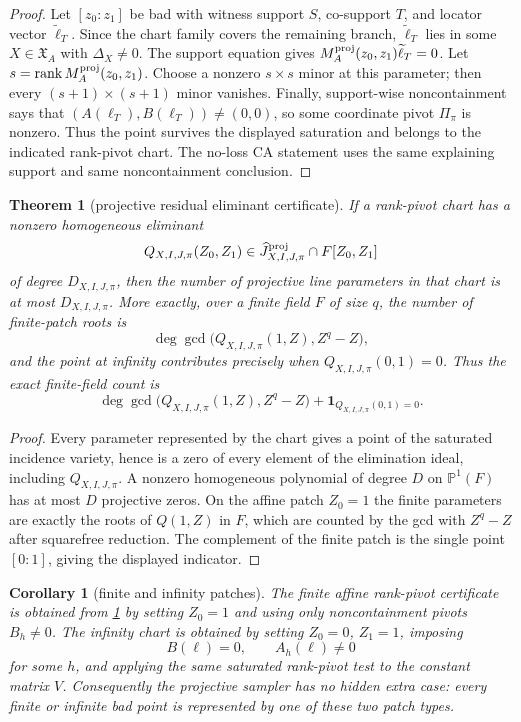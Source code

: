 \documentclass[11pt]{article}
\newtheorem{theorem}{Theorem}[section]
\newtheorem{corollary}[corollary]{Corollary}
\theoremstyle{definition}
\theoremstyle{remark}
\begin{document}
\begin{proof}
Let $[z_0:z_1]$ be bad with witness support $S$, co-support $T$, and locator
vector $\widetilde\ell_T$.  Since the chart family covers the remaining branch,
$\widetilde\ell_T$ lies in some $X\in\mathfrak X_A$ with $\Delta_X\ne0$.  The
support equation gives
$M^{\rm proj}_A(z_0,z_1)\widetilde\ell_T=0$.  Let
$s=\operatorname{rank}M^{\rm proj}_A(z_0,z_1)$.  Choose a nonzero
$s\times s$ minor at this parameter; then every $(s+1)\times(s+1)$ minor
vanishes.  Finally, support-wise noncontainment says that
$(A(\ell_T),B(\ell_T))\ne(0,0)$, so some coordinate pivot $\Pi_\pi$ is nonzero.
Thus the point survives the displayed saturation and belongs to the indicated
rank-pivot chart.  The no-loss CA statement uses the same explaining support and
same noncontainment conclusion.
\end{proof}

\begin{theorem}[projective residual eliminant certificate]
\label{thm:projective-residual-eliminant-certificate}
If a rank-pivot chart has a nonzero homogeneous eliminant
\[
        Q_{X,I,J,\pi}(Z_0,Z_1)
        \in
        \widehat J^{\rm proj}_{X,I,J,\pi}\cap F[Z_0,Z_1]
\]
of degree $D_{X,I,J,\pi}$, then the number of projective line parameters in that
chart is at most $D_{X,I,J,\pi}$.  More exactly, over a finite field $F$ of size
$q$, the number of finite-patch roots is
\[
        \deg\gcd\bigl(Q_{X,I,J,\pi}(1,Z),Z^q-Z\bigr),
\]
and the point at infinity contributes precisely when
$Q_{X,I,J,\pi}(0,1)=0$.  Thus the exact finite-field count is
\[
        \deg\gcd\bigl(Q_{X,I,J,\pi}(1,Z),Z^q-Z\bigr)
        +\mathbf 1_{Q_{X,I,J,\pi}(0,1)=0}.
\]
\end{theorem}

\begin{proof}
Every parameter represented by the chart gives a point of the saturated
incidence variety, hence is a zero of every element of the elimination ideal,
including $Q_{X,I,J,\pi}$.  A nonzero homogeneous polynomial of degree $D$ on
$\mathbb P^1(F)$ has at most $D$ projective zeros.  On the affine patch
$Z_0=1$ the finite parameters are exactly the roots of $Q(1,Z)$ in $F$, which
are counted by the gcd with $Z^q-Z$ after squarefree reduction.  The complement
of the finite patch is the single point $[0:1]$, giving the displayed indicator.
\end{proof}

\begin{corollary}[finite and infinity patches]
\label{cor:finite-infinity-rank-pivot-patches}
The finite affine rank-pivot certificate is obtained from
\cref{thm:projective-residual-eliminant-certificate} by setting $Z_0=1$ and
using only noncontainment pivots $B_h\ne0$.  The infinity chart is obtained by
setting $Z_0=0$, $Z_1=1$, imposing
\[
        B(\ell)=0,
        \qquad
        A_h(\ell)\ne0
\]
for some $h$, and applying the same saturated rank-pivot test to the constant
matrix $V$.  Consequently the projective sampler has no hidden extra case: every
finite or infinite bad point is represented by one of these two patch types.
\end{corollary}
\end{document}
